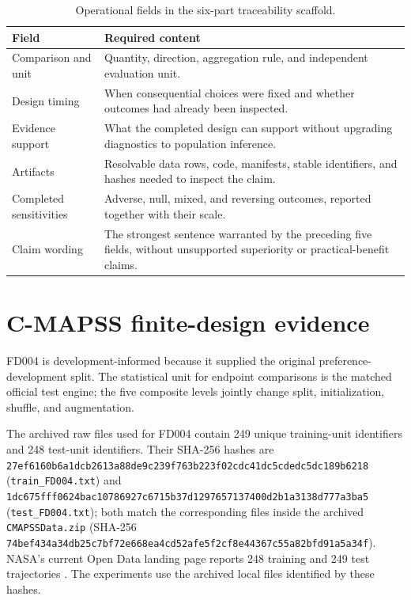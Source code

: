 \documentclass[11pt,a4paper]{article}
\begin{document}
\begin{table}[H]
\centering
\small
\caption{Operational fields in the six-part traceability scaffold.}
\label{tab:supp-sixpart}
\begin{tabular}{@{}p{}p{}@{}}
\toprule
Field & Required content \\
\midrule
Comparison and unit & Quantity, direction, aggregation rule, and independent evaluation unit. \\
Design timing & When consequential choices were fixed and whether outcomes had already been inspected. \\
Evidence support & What the completed design can support without upgrading diagnostics to population inference. \\
Artifacts & Resolvable data rows, code, manifests, stable identifiers, and hashes needed to inspect the claim. \\
Completed sensitivities & Adverse, null, mixed, and reversing outcomes, reported together with their scale. \\
Claim wording & The strongest sentence warranted by the preceding five fields, without unsupported superiority or practical-benefit claims. \\
\bottomrule
\end{tabular}
\end{table}

\section{C-MAPSS finite-design evidence}

FD004 is development-informed because it supplied the original preference-development split. The statistical unit for endpoint comparisons is the matched official test engine; the five composite levels jointly change split, initialization, shuffle, and augmentation.

The archived raw files used for FD004 contain 249 unique training-unit identifiers and 248 test-unit identifiers. Their SHA-256 hashes are \nolinkurl{27ef6160b6a1dcb2613a88de9c239f763b223f02cdc41dc5cdedc5dc189b6218} (\texttt{train\_FD004.txt}) and \nolinkurl{1dc675fff0624bac10786927c6715b37d1297657137400d2b1a3138d777a3ba5} (\texttt{test\_FD004.txt}); both match the corresponding files inside the archived \texttt{CMAPSSData.zip} (SHA-256 \nolinkurl{74bef434a34db25c7bf72e668ea4cd52afe5f2cf8e44367c55a82bfd91a5a34f}). NASA's current Open Data landing page reports 248 training and 249 test trajectories \citep{NASA_CMAPSS_OpenData}. The experiments use the archived local files identified by these hashes.
\end{document}
